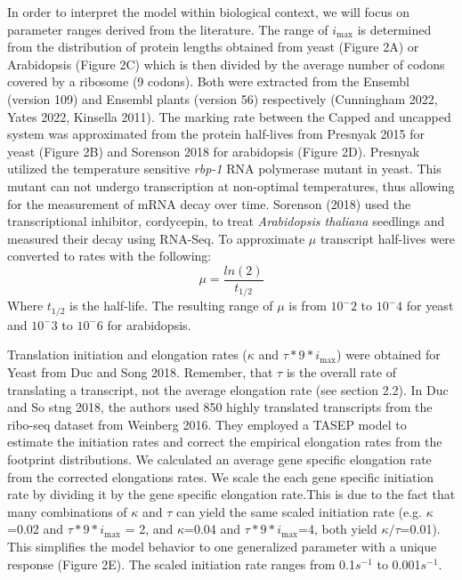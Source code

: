 \documentclass[review]{elsarticle}
\newcommand{\imax}{\ensuremath{i_{\max}}\xspace}
\begin{document}
In order to  interpret the model within biological context, we will focus on parameter ranges derived from the literature.
The range of \imax is determined from the distribution of protein lengths obtained from yeast (Figure 2A) or Arabidopsis (Figure 2C) which is then divided by the average number of codons covered by a ribosome (9 codons). 
Both were extracted from the Ensembl (version 109) and Ensembl plants (version 56) respectively (Cunningham 2022, Yates 2022, Kinsella 2011).  
The marking rate between the Capped and uncapped system was approximated from the protein half-lives from Presnyak 2015 for yeast (Figure 2B) and Sorenson 2018 for arabidopsis (Figure 2D).
 Presnyak utilized the temperature sensitive \textit{rbp-1} RNA polymerase mutant in yeast. This mutant can not undergo transcription at non-optimal temperatures, thus allowing for the measurement of mRNA decay over time. Sorenson (2018) used the transcriptional inhibitor, cordycepin, to treat  \textit{Arabidopsis thaliana} seedlings and measured their decay using RNA-Seq.
To approximate $\mu$ transcript half-lives were converted to rates with the following:
	\begin{equation}\label{eq:eq_half-life_conversion_to_rate}
		\mu = \frac{ln(2)}{t_{1/2}}
	\end{equation}
Where $t_{1/2}$ is the half-life. The resulting range of $\mu$ is from $10^-2$ to $10^-4$ for yeast and $10^-3$ to $10^-6$ for arabidopsis. 

Translation initiation and elongation rates ($\kappa$ and $\tau*9*\imax$) were obtained for Yeast from Duc and Song 2018. Remember, that $\tau$ is the overall rate of translating a transcript, not the average elongation rate (see section 2.2). In Duc and So stng 2018, the authors used 850 highly translated transcripts from the ribo-seq dataset from Weinberg 2016. They employed a TASEP model to estimate the initiation rates and correct the empirical elongation rates from the footprint distributions. We calculated an average gene specific elongation rate from the corrected elongations rates. We scale the each gene specific initiation rate by dividing it by the gene specific elongation rate.This is due to the fact that many combinations of $\kappa$ and $\tau$ can yield the same scaled initiation rate (e.g. $\kappa$ =0.02 and $\tau*9*\imax$ = 2, and $\kappa$=0.04 and $\tau*9*\imax$=4, both yield $\kappa/\tau$=0.01). This simplifies the model behavior to one generalized parameter with a unique response (Figure 2E).  The scaled initiation rate ranges from 0.1$s^{-1}$ to 0.001$s^{-1}$.
\end{document}
